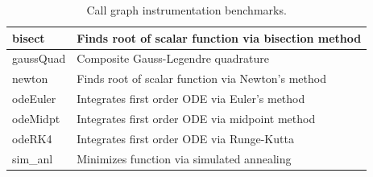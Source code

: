 \begin{table}
\begin{tabular}{| l | p{10cm} |}
  bisect      & Finds root of scalar function via bisection method \\ \hline
  gaussQuad   & Composite Gauss-Legendre quadrature \\ \hline
  newton      & Finds root of scalar function via Newton's method \\ \hline
  odeEuler    & Integrates first order ODE via Euler's method \\\hline
  odeMidpt    & Integrates first order ODE via midpoint method \\ \hline
  odeRK4      & Integrates first order ODE via Runge-Kutta \\ \hline
  sim\_anl    & Minimizes function via simulated annealing \\ \hline
\end{tabular}
\caption{Call graph instrumentation benchmarks.}
\label{tab:InstrumentationBenchmarks}
\end{table}

